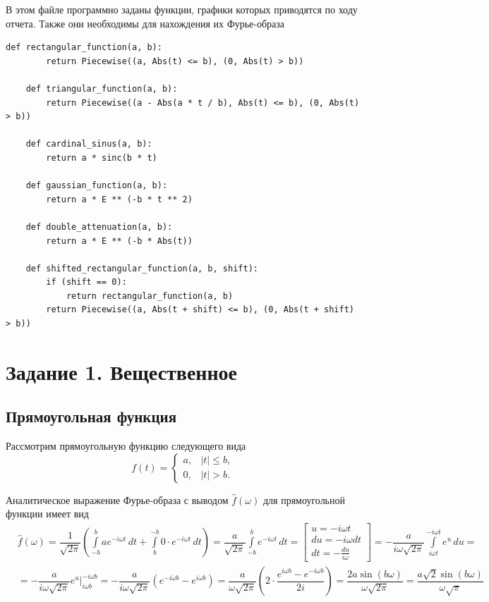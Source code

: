 \documentclass[a4paper, 16pt]{article}
\begin{document}
    \noindent В этом файле программно заданы функции, графики которых приводятся по ходу отчета. Также они необходимы
    для нахождения их Фурье-образа
    \begin{lstlisting}[label=funcs, caption=Программно заданные функции для заданий 1 и 2]
    def rectangular_function(a, b):
        return Piecewise((a, Abs(t) <= b), (0, Abs(t) > b))

    def triangular_function(a, b):
        return Piecewise((a - Abs(a * t / b), Abs(t) <= b), (0, Abs(t) > b))

    def cardinal_sinus(a, b):
        return a * sinc(b * t)
    
    def gaussian_function(a, b):
        return a * E ** (-b * t ** 2)
    
    def double_attenuation(a, b):
        return a * E ** (-b * Abs(t))

    def shifted_rectangular_function(a, b, shift):
        if (shift == 0):
            return rectangular_function(a, b)
        return Piecewise((a, Abs(t + shift) <= b), (0, Abs(t + shift) > b))
    \end{lstlisting}


    \section{Задание 1. Вещественное}
    \subsection{Прямоугольная функция}
    \noindent Рассмотрим прямоугольную функцию следующего вида
    $$
    f(t)=
    \begin{cases}
        a, & \left|t\right|\leq b,\\
        0, & \left|t\right|>b.
    \end{cases}
    $$


    \noindent Аналитическое выражение Фурье-образа с выводом
    $\hat{f}(\omega)$ для прямоугольной функции имеет вид
    \begin{align*}
        & \hat{f}(\omega)=\dfrac{1}{\sqrt{2\pi}}\left(\int\limits_{-b}^{b}ae^{-i\omega t}\,dt+\int\limits_{b}^{-b}0\cdot e^{-i\omega t}\,dt\right)=
        \dfrac{a}{\sqrt{2\pi}}\int\limits_{-b}^{b}e^{-i\omega t}\,dt=
        \begin{bmatrix}
            u=-i\omega t\\
            du=-i\omega dt\\
            dt=-\frac{du}{i\omega}
        \end{bmatrix}=
        -\dfrac{a}{i\omega \sqrt{2\pi}}\int\limits_{i\omega t}^{-i\omega t}e^{u}\,du=\\
        & =-\dfrac{a}{i\omega \sqrt{2\pi}}e^{u}\bigg|_{i\omega b}^{-i\omega b}=
        -\dfrac{a}{i\omega \sqrt{2\pi}}\left(e^{-i\omega b}-e^{i\omega b}\right)=\dfrac{a}{\omega \sqrt{2\pi}}\left(2\cdot\dfrac{e^{i\omega b}-e^{-i\omega b}}{2i}\right)=
        \dfrac{2a\sin{(b\omega)}}{\omega \sqrt{2\pi}}=\dfrac{a\sqrt{2}\sin{(b\omega)}}{\omega\sqrt{\pi}}
    \end{align*}
\end{document}
